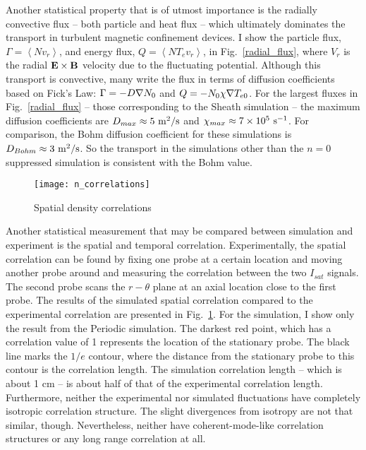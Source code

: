 Another statistical property that is of utmost importance is the radially convective flux -- both particle and heat flux -- which ultimately dominates the transport in turbulent magnetic
confinement devices. I show the particle flux, $\Gamma = \left< N v_r \right>$, and energy flux, $Q = \left< N T_e v_r \right>$, in Fig.~\ref{radial_flux}, where $V_r$ is the radial
${\bf E \times B}$ velocity due to the fluctuating potential. Although this transport is convective, many write the flux in terms of diffusion coefficients based on Fick's Law:
$\Gamma = - D \nabla N_0$ and $Q = -N_0 \chi \nabla T_{e0}$. For the largest fluxes in Fig.~\ref{radial_flux} -- those corresponding to the Sheath simulation -- the maximum diffusion coefficients
are $D_{max} \approx 5 \ \rm{m^2/s}$ and $\chi_{max} \approx 7 \times 10^{5} \ \rm{s^{-1}}$. For comparison, the Bohm diffusion coefficient for these simulations is $D_{Bohm} \approx 3 \ \rm{m^2/s}$.
So the transport in the simulations other than the $n=0$ suppressed simulation is consistent with the Bohm value.

\begin{figure}
\centerline{\texttt{[image: n\_correlations]}}
\caption{Spatial density correlations}
\label{n_correlation}
\end{figure}


Another statistical measurement that may be compared between simulation and experiment is the spatial and temporal correlation. Experimentally, the spatial correlation
can be found by fixing one probe at a certain
location and moving another probe around and measuring the correlation between the two $I_{sat}$ signals. The second probe scans the $r-\theta$ plane at an axial location close
to the first probe. The results of the simulated spatial correlation compared to the experimental correlation are presented in Fig.~\ref{n_correlation}. For the simulation, I show only
the result from the Periodic simulation. The darkest red point, which
has a correlation value of 1 represents the location of the stationary probe. The black line marks the $1/e$ contour, where the distance from the stationary probe to this contour is
the correlation length. The simulation correlation length -- which is about 1 cm -- is about half of that of the experimental correlation length. Furthermore, neither the experimental nor simulated
fluctuations have completely isotropic correlation structure. The slight divergences from isotropy are not that similar, though. Nevertheless, neither have coherent-mode-like correlation
structures or any long range correlation at all.


